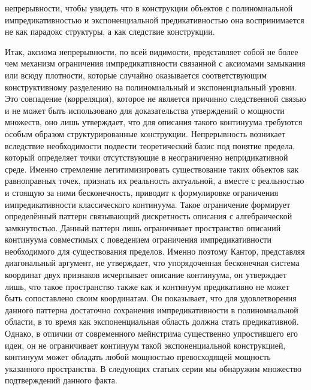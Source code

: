\documentclass[12pt]{article}
\begin{document}
непрерывности, чтобы увидеть что в конструкции объектов с полиномиальной импредикативностью и экспоненциальной предикативностью она воспринимается не как парадокс структуры, а как следствие конструкции. 

Итак, аксиома непрерывности, по всей видимости, представляет собой не более чем механизм ограничения импредикативности связанной с аксиомами замыкания или всюду плотности, которые случайно оказывается соответствующим конструктивному разделению на полиномиальный и экспоненциальный уровни. Это совпадение (корреляция), которое не является причинно следственной связью и не может быть использовано для доказательства утверждений о мощности множеств, оно лишь утверждает, что для описания такого континуума требуются особым образом структурированные конструкции. Непрерывность возникает вследствие необходимости подвести теоретический базис под понятие предела, который определяет точки отсутствующие в неограниченно непридикативной среде. Именно стремление легитимизировать существование таких объектов как равноправных точек, признать их реальность актуальной, а вместе с реальностью и стоящую за ними бесконечность, приводит к формулировке ограничения импредикативности классического континуума. Такое ограничение формирует определённый паттерн связывающий дискретность описания с алгебраической замкнутостью. Данный паттерн лишь ограничивает пространство описаний континуума совместимых с поведением ограничения импредикативности необходимого для существования пределов. Именно поэтому Кантор, представляя диагональный аргумент, не утверждает, что упорядоченная бесконечная система координат двух признаков исчерпывает описание континуума, он утверждает лишь, что такое пространство также как и континуум предикативно не может быть сопоставлено своим координатам. Он показывает, что для удовлетворения данного паттерна достаточно сохранения импредикативности в полиномиальной области, в то время как экспоненциальная область должна стать предикативной. Однако, в отличии от современного мейнстрима существенно упростившего его идеи, он не ограничивает континуум такой экспоненциальной конструкцией, континуум может обладать любой мощностью превосходящей мощность указанного пространства. В следующих статьях серии мы обнаружим множество подтверждений данного факта.
\end{document}
